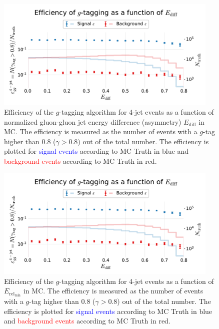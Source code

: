 \begin{figure}
  \centerfloat
  \includegraphics[width=0.95\textwidth, trim=10 10 10 50, clip, page=1]{figures/quarks/efficiency_events-down_sample=1.00-ML_vars=vertex-selection=b-ejet_min=4-n_iter_RS_lgb=99-n_iter_RS_xgb=9-cdot_cut=0.90-version=19-njet=4.pdf}
  \caption[$g$-Tagging Efficiency for 4-Jet Events in MC as a Function of $E_\mathrm{diff}$]
          {Efficiency of the $g$-tagging algorithm for 4-jet events as a function of normalized gluon-gluon jet energy difference (asymmetry) $E_\mathrm{diff}$  in MC. The efficiency is measured as the number of events with a $g$-tag higher than 0.8 ($\gamma > 0.8$) out of the total number. The efficiency is plotted for \textcolor{blue}{signal events} according to MC Truth in blue and \textcolor{red}{background events} according to MC Truth in red.
          } 
  \label{fig:q:effiency_gtag_E_diff}
\end{figure}
\begin{figure}
  \centerfloat
  \includegraphics[width=0.95\textwidth, trim=10 10 10 50, clip, page=2]{figures/quarks/efficiency_events-down_sample=1.00-ML_vars=vertex-selection=b-ejet_min=4-n_iter_RS_lgb=99-n_iter_RS_xgb=9-cdot_cut=0.90-version=19-njet=4.pdf}
  \caption[$g$-Tagging Efficiency for 4-Jet Events in MC as a Function of $E_{\mathrm{rel}_\mathrm{min}}$]
          {Efficiency of the $g$-tagging algorithm for 4-jet events as a function of $E_{\mathrm{rel}_\mathrm{min}}$ in MC. The efficiency is measured as the number of events with a $g$-tag higher than 0.8 ($\gamma > 0.8$) out of the total number. The efficiency is plotted for \textcolor{blue}{signal events} according to MC Truth in blue and \textcolor{red}{background events} according to MC Truth in red.
          } 
  \label{fig:q:effiency_gtag_E_rel_min}
\end{figure}
